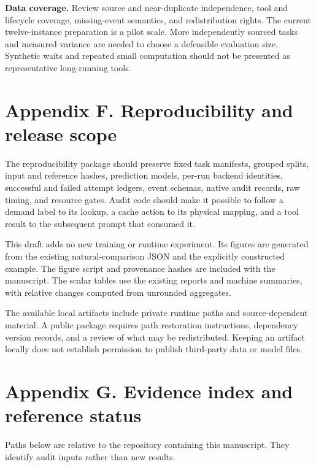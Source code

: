 \documentclass[
  english,
  10pt,
]{article}
\begin{document}
\textbf{Data coverage.} Review source and near-duplicate independence,
tool and lifecycle coverage, missing-event semantics, and redistribution
rights. The current twelve-instance preparation is a pilot scale. More
independently sourced tasks and measured variance are needed to choose a
defensible evaluation size. Synthetic waits and repeated small
computation should not be presented as representative long-running
tools.

\section{Appendix F. Reproducibility and release
scope}\label{appendix-f.-reproducibility-and-release-scope}

The reproducibility package should preserve fixed task manifests,
grouped splits, input and reference hashes, prediction models, per-run
backend identities, successful and failed attempt ledgers, event
schemas, native audit records, raw timing, and resource gates. Audit
code should make it possible to follow a demand label to its lookup, a
cache action to its physical mapping, and a tool result to the
subsequent prompt that consumed it.

This draft adds no new training or runtime experiment. Its figures are
generated from the existing natural-comparison JSON and the explicitly
constructed example. The figure script and provenance hashes are
included with the manuscript. The scalar tables use the existing reports
and machine summaries, with relative changes computed from unrounded
aggregates.

The available local artifacts include private runtime paths and
source-dependent material. A public package requires path restoration
instructions, dependency version records, and a review of what may be
redistributed. Keeping an artifact locally does not establish permission
to publish third-party data or model files.

\section{Appendix G. Evidence index and reference
status}\label{appendix-g.-evidence-index-and-reference-status}

Paths below are relative to the repository containing this manuscript.
They identify audit inputs rather than new results.
\end{document}
